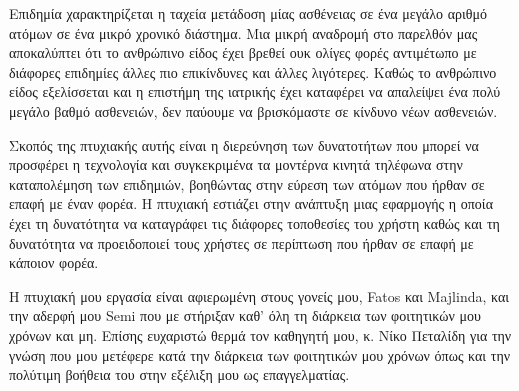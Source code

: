 \documentclass[oneside, 12pt]{book}
\begin{document}
\Titlepage
\Declarationpage
\begin{Abstract}
Επιδημία χαρακτηρίζεται η ταχεία μετάδοση μίας ασθένειας σε ένα μεγάλο αριθμό ατόμων σε ένα μικρό χρονικό διάστημα. Μια μικρή αναδρομή στο παρελθόν μας αποκαλύπτει ότι το ανθρώπινο είδος έχει βρεθεί ουκ ολίγες φορές αντιμέτωπο με διάφορες επιδημίες άλλες πιο επικίνδυνες και άλλες λιγότερες. Καθώς το ανθρώπινο είδος εξελίσσεται και η επιστήμη της ιατρικής έχει καταφέρει να απαλείψει ένα πολύ μεγάλο βαθμό ασθενειών, δεν παύουμε να βρισκόμαστε σε κίνδυνο νέων ασθενειών.
\par
Σκοπός της πτυχιακής αυτής είναι η διερεύνηση των δυνατοτήτων που μπορεί να προσφέρει η τεχνολογία και συγκεκριμένα τα μοντέρνα κινητά τηλέφωνα στην καταπολέμηση των επιδημιών, βοηθώντας στην εύρεση των ατόμων που ήρθαν σε επαφή με έναν φορέα.  Η πτυχιακή εστιάζει στην ανάπτυξη μιας εφαρμογής η οποία έχει τη δυνατότητα να καταγράφει τις διάφορες τοποθεσίες του χρήστη  καθώς και τη δυνατότητα να προειδοποιεί τους χρήστες σε περίπτωση που ήρθαν σε επαφή με κάποιον φορέα.
\end{Abstract}
\tableofcontents

\listoftables
\listoffigures
\lstlistoflistings



\begin{Acknowledgement}
Η πτυχιακή μου εργασία είναι αφιερωμένη στους γονείς μου, Fatos και Majlinda, και την αδερφή μου Semi που με στήριξαν καθ’ όλη τη διάρκεια των φοιτητικών μου χρόνων και μη. Επίσης ευχαριστώ θερμά τον καθηγητή μου, κ. Νίκο Πεταλίδη για την γνώση που μου μετέφερε κατά την διάρκεια των φοιτητικών μου χρόνων όπως και την πολύτιμη βοήθεια του στην εξέλιξη μου ως επαγγελματίας.
\end{Acknowledgement}



\end{document}

